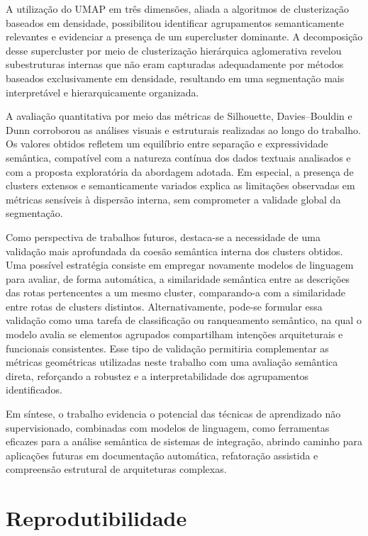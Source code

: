 \documentclass[12pt,a4paper]{article}
\begin{document}
A utilização do UMAP em três dimensões, aliada a algoritmos de clusterização baseados em densidade, possibilitou identificar agrupamentos semanticamente relevantes e evidenciar a presença de um supercluster dominante. A decomposição desse supercluster por meio de clusterização hierárquica aglomerativa revelou subestruturas internas que não eram capturadas adequadamente por métodos baseados exclusivamente em densidade, resultando em uma segmentação mais interpretável e hierarquicamente organizada.

A avaliação quantitativa por meio das métricas de Silhouette, Davies–Bouldin e Dunn corroborou as análises visuais e estruturais realizadas ao longo do trabalho. Os valores obtidos refletem um equilíbrio entre separação e expressividade semântica, compatível com a natureza contínua dos dados textuais analisados e com a proposta exploratória da abordagem adotada. Em especial, a presença de clusters extensos e semanticamente variados explica as limitações observadas em métricas sensíveis à dispersão interna, sem comprometer a validade global da segmentação.

Como perspectiva de trabalhos futuros, destaca-se a necessidade de uma validação mais aprofundada da coesão semântica interna dos clusters obtidos. Uma possível estratégia consiste em empregar novamente modelos de linguagem para avaliar, de forma automática, a similaridade semântica entre as descrições das rotas pertencentes a um mesmo cluster, comparando-a com a similaridade entre rotas de clusters distintos. Alternativamente, pode-se formular essa validação como uma tarefa de classificação ou ranqueamento semântico, na qual o modelo avalia se elementos agrupados compartilham intenções arquiteturais e funcionais consistentes. Esse tipo de validação permitiria complementar as métricas geométricas utilizadas neste trabalho com uma avaliação semântica direta, reforçando a robustez e a interpretabilidade dos agrupamentos identificados.

Em síntese, o trabalho evidencia o potencial das técnicas de aprendizado não supervisionado, combinadas com modelos de linguagem, como ferramentas eficazes para a análise semântica de sistemas de integração, abrindo caminho para aplicações futuras em documentação automática, refatoração assistida e compreensão estrutural de arquiteturas complexas.


\section*{Reprodutibilidade}
\end{document}
